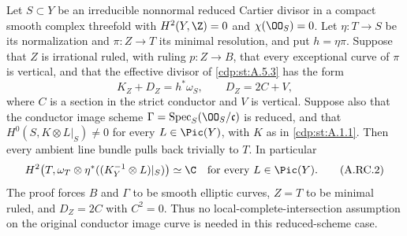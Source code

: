 
\begin{proposition}\label{cdp:st:A.5.9}
Let $S\subset Y$ be an irreducible nonnormal reduced Cartier
divisor in a compact smooth complex threefold with
$H^2(Y,\Z)=0$ and $\chi(\OO_S)=0$.
Let $\eta:T\to S$ be its normalization and
$\pi:Z\to T$ its minimal resolution, and put $h=\eta\pi$.
Suppose that $Z$ is irrational ruled, with ruling $p:Z\to B$,
that every exceptional curve of $\pi$ is vertical, and that
the effective divisor of \ref{cdp:st:A.5.3} has the form
\[
 K_Z+D_Z=h^*\omega_S,\qquad D_Z=2C+V,                 \tag{A.RC.1}\label{cdp:eq:A.RC.1}
\]
where $C$ is a section in the strict conductor and $V$ is
vertical. Suppose also that the conductor image scheme
$\Gamma=\operatorname{Spec}_S(\OO_S/\mathfrak c)$ is reduced,
and that $H^0(S,K\otimes L|_S)\ne0$ for every $L\in\Pic(Y)$,
with $K$ as in \ref{cdp:st:A.1.1}.
Then every ambient line bundle pulls back trivially to $T$.
In particular
\[
 H^2\bigl(T,\omega_T\otimes
       \eta^*((K_Y^{-1}\otimes L)|_S)\bigr)\simeq\C
       \quad\hbox{for every }L\in\Pic(Y).            \tag{A.RC.2}\label{cdp:eq:A.RC.2}
\]
The proof forces $B$ and $\Gamma$ to be smooth elliptic curves,
$Z=T$ to be minimal ruled, and $D_Z=2C$ with $C^2=0$.
Thus no local-complete-intersection assumption on the original
conductor image curve is needed in this reduced-scheme case.
\end{proposition}
